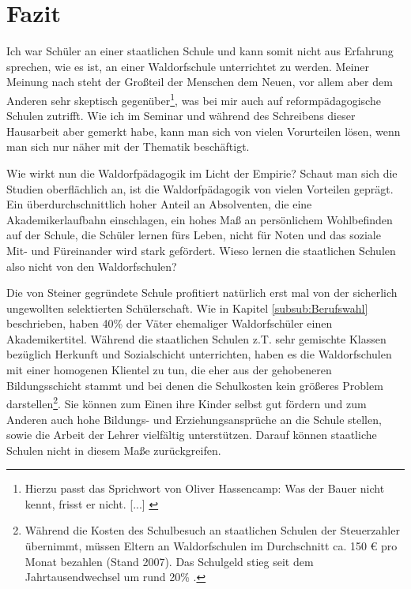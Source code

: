 \section{Fazit}

Ich war Schüler an einer staatlichen Schule und kann somit nicht aus Erfahrung sprechen, wie es ist, an einer Waldorfschule unterrichtet zu werden. Meiner Meinung nach steht der Großteil der Menschen dem Neuen, vor allem aber dem Anderen sehr skeptisch gegenüber\footnote{Hierzu passt das Sprichwort von Oliver Hassencamp: Was der Bauer nicht kennt, frisst er nicht. [...] \citep[Vgl.][]{roschk13}}, was bei mir auch auf reformpädagogische Schulen zutrifft. Wie ich im Seminar und während des Schreibens dieser Hausarbeit aber  gemerkt habe, kann man sich von vielen Vorurteilen lösen, wenn man sich nur näher mit der Thematik beschäftigt.

Wie wirkt nun die Waldorfpädagogik im Licht der Empirie? Schaut man sich die Studien oberflächlich an, ist die Waldorfpädagogik von vielen Vorteilen geprägt. Ein überdurchschnittlich hoher Anteil an Absolventen, die eine Akademikerlaufbahn einschlagen, ein hohes Maß an persönlichem Wohlbefinden auf der Schule, die Schüler lernen fürs Leben, nicht für Noten und das soziale Mit- und Füreinander wird stark gefördert. Wieso lernen die staatlichen Schulen also nicht von den Waldorfschulen?

Die von Steiner gegründete Schule profitiert natürlich erst mal von der sicherlich ungewollten selektierten Schülerschaft. Wie in Kapitel \ref{subsub:Berufswahl} beschrieben, haben 40\% der Väter ehemaliger Waldorfschüler einen Akademikertitel. Während die staatlichen Schulen z.T. sehr gemischte Klassen bezüglich Herkunft und Sozialschicht unterrichten, haben es die Waldorfschulen mit einer homogenen Klientel zu tun, die eher aus der gehobeneren Bildungsschicht stammt und bei denen die Schulkosten kein größeres Problem darstellen\footnote{Während die Kosten des Schulbesuch an staatlichen Schulen der Steuerzahler übernimmt, müssen Eltern an Waldorfschulen im Durchschnitt ca. 150 € pro Monat bezahlen (Stand 2007). Das Schulgeld stieg seit dem Jahrtausendwechsel um rund 20\% \citep[vgl.][]{mannheim09}.}. Sie können zum Einen ihre Kinder selbst gut fördern und zum Anderen auch hohe Bildungs- und Erziehungsansprüche an die Schule stellen, sowie die Arbeit der Lehrer vielfältig unterstützen. Darauf können staatliche Schulen nicht in diesem Maße zurückgreifen. 

